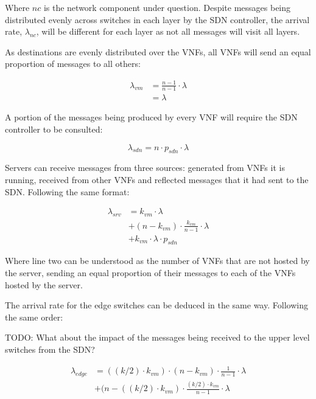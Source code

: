 Where $nc$ is the network component under question. Despite messages being distributed evenly across switches in each layer by the SDN controller, the arrival rate, $\lambda_{nc}$, will be different for each layer as not all messages will visit all layers.

As destinations are evenly distributed over the VNFs, all VNFs will send an equal proportion of messages to all others:

\begin{equation}
\label{eq:arr_vnf}
\begin{split}
\lambda_{vm} &= \frac{n - 1}{n - 1} \cdot \lambda \\
			 &= \lambda
\end{split}
\end{equation}

A portion of the messages being produced by every VNF will require the SDN controller to be consulted:

\begin{equation}
\label{eq:arr_sdn}
\lambda_{sdn} = n \cdot p_{sdn} \cdot \lambda
\end{equation}

Servers can receive messages from three sources: generated from VNFs it is running, received from other VNFs and reflected messages that it had sent to the SDN. Following the same format:

\begin{equation}
\label{eq:arr_srv}
\begin{split}
\lambda_{srv} &= k_{vm} \cdot \lambda \\
			  &+ (n - k_{vm}) \cdot  \frac{k_{vm}}{n - 1} \cdot \lambda \\
			  &+ k_{vm} \cdot \lambda \cdot p_{sdn}
\end{split}
\end{equation}

Where line two can be understood as the number of VNFs that are not hosted by the server, sending an equal proportion of their messages to each of the VNFs hosted by the server.

The arrival rate for the edge switches can be deduced in the same way. Following the same order:

TODO: What about the impact of the messages being received to the upper level switches from the SDN?

\begin{equation}
\label{eq:arr_edge}
\begin{split}
\lambda_{edge} &= ((k/2) \cdot k_{vm}) \cdot (n - k_{vm}) \cdot \frac{1}{n - 1} \cdot \lambda \\
			   &+ (n - ((k/2) \cdot k_{vm}) \cdot \frac{(k/2) \cdot k_{vm}}{n - 1} \cdot \lambda 
\end{split}
\end{equation}

